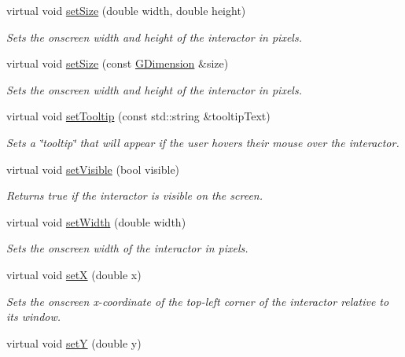 \begin{DoxyCompactItemize}
virtual void \mbox{\hyperlink{classGInteractor_aca25d49481f9bf5fc8f7df4c086c4ce7}{set\+Size}} (double width, double height)
\begin{DoxyCompactList}\small\item\em Sets the onscreen width and height of the interactor in pixels. \end{DoxyCompactList}\item 
virtual void \mbox{\hyperlink{classGInteractor_ae2b628228f192c2702c4ce941b2af68f}{set\+Size}} (const \mbox{\hyperlink{structGDimension}{G\+Dimension}} \&size)
\begin{DoxyCompactList}\small\item\em Sets the onscreen width and height of the interactor in pixels. \end{DoxyCompactList}\item 
virtual void \mbox{\hyperlink{classGInteractor_a039e0e49beaecc275efce02d416acea8}{set\+Tooltip}} (const std\+::string \&tooltip\+Text)
\begin{DoxyCompactList}\small\item\em Sets a \char`\"{}tooltip\char`\"{} that will appear if the user hovers their mouse over the interactor. \end{DoxyCompactList}\item 
virtual void \mbox{\hyperlink{classGInteractor_a18e44e30b31525a243960ca3928125aa}{set\+Visible}} (bool visible)
\begin{DoxyCompactList}\small\item\em Returns true if the interactor is visible on the screen. \end{DoxyCompactList}\item 
virtual void \mbox{\hyperlink{classGInteractor_aa3f3fba4cb131baa8696ba01e3bceca1}{set\+Width}} (double width)
\begin{DoxyCompactList}\small\item\em Sets the onscreen width of the interactor in pixels. \end{DoxyCompactList}\item 
virtual void \mbox{\hyperlink{classGInteractor_a9c18fcc579333bf9653d13ad2b372e39}{setX}} (double x)
\begin{DoxyCompactList}\small\item\em Sets the onscreen x-\/coordinate of the top-\/left corner of the interactor relative to its window. \end{DoxyCompactList}\item 
virtual void \mbox{\hyperlink{classGInteractor_a7d57e2a5c35d27feb58fd498a3cf82b9}{setY}} (double y)

\end{DoxyCompactItemize}

